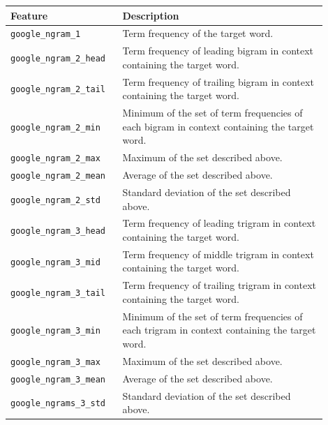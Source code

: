 \documentclass{dcthesis}
\theoremstyle{definition}
\theoremstyle{remark}
\begin{document}
\begin{table}[H]
  \centering
  \begin{tabular}{>{\centering\arraybackslash}p{0.3\linewidth}>{\arraybackslash}p{0.6\linewidth}}
    \textbf{Feature} & \textbf{Description} \\ \hline 
    \texttt{google\_ngram\_1} & Term frequency of the target word.\\
    \hline 
    \texttt{google\_ngram\_2\_head} & Term frequency of leading bigram in context containing the target word.\\
    \hline 
    \texttt{google\_ngram\_2\_tail} & Term frequency of trailing bigram in context containing the target word.\\
    \hline 
    \texttt{google\_ngram\_2\_min} & Minimum of the set of term frequencies of each bigram in context containing the target word.\\
    \hline 
    \texttt{google\_ngram\_2\_max} & Maximum of the set described above.\\
    \hline 
    \texttt{google\_ngram\_2\_mean} & Average of the set described above.\\
    \hline 
    \texttt{google\_ngram\_2\_std} & Standard deviation of the set described above.\\
    \hline 
    \texttt{google\_ngram\_3\_head} & Term frequency of leading trigram in context containing the target word.\\
    \hline 
    \texttt{google\_ngram\_3\_mid} & Term frequency of middle trigram in context containing the target word.\\
    \hline 
    \texttt{google\_ngram\_3\_tail} & Term frequency of trailing trigram in context containing the target word.\\
    \hline 
    \texttt{google\_ngram\_3\_min} & Minimum of the set of term frequencies of each trigram in context containing the target word.\\
    \hline 
    \texttt{google\_ngram\_3\_max} & Maximum of the set described above.\\
    \hline 
    \texttt{google\_ngram\_3\_mean} & Average of the set described above.\\
    \hline 
    \texttt{google\_ngrams\_3\_std} & Standard deviation of the set described above.\\
  \end{tabular}
  \label{word_frequency_and_n_gram_features_google_ngram_based}
\end{table}
\end{document}
